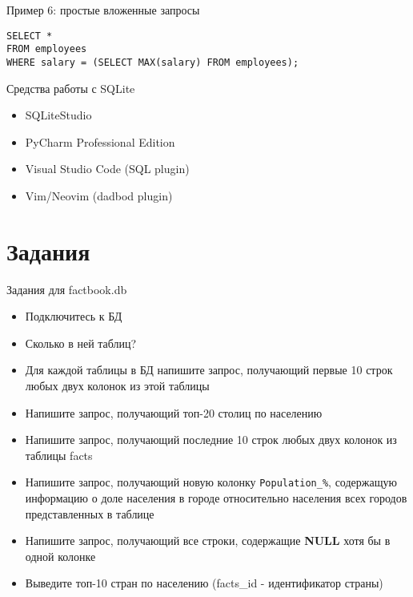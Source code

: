 \documentclass{beamer}
\begin{document}
\begin{frame}[fragile]{Пример 6: простые вложенные запросы}
	\begin{verbatim}
SELECT *
FROM employees
WHERE salary = (SELECT MAX(salary) FROM employees);
    \end{verbatim}
\end{frame}

\begin{frame}[fragile]{Средства работы с SQLite}
	\begin{itemize}
		\item SQLiteStudio
		\item PyCharm Professional Edition
		\item Visual Studio Code (SQL plugin)
		\item Vim/Neovim (dadbod plugin)
	\end{itemize}
\end{frame}

\section{Задания}

\begin{frame}[fragile]{Задания для factbook.db}
	\begin{itemize}
		\item Подключитесь к БД
		\item Сколько в ней таблиц?
		\item Для каждой таблицы в БД напишите запрос, получающий первые 10 строк любых двух колонок из этой таблицы
		\item Напишите запрос, получающий топ-20 столиц по населению
		\item Напишите запрос, получающий последние 10 строк любых двух колонок из таблицы facts
		\item Напишите запрос, получающий новую колонку \texttt{Population\_\%}, содержащую информацию о доле населения в городе относительно населения всех городов представленных в таблице
		\item Напишите запрос, получающий все строки, содержащие \textbf{NULL} хотя бы в одной колонке
		\item Выведите топ-10 стран по населению (facts\_id - идентификатор страны)
	\end{itemize}
\end{frame}
\end{document}
